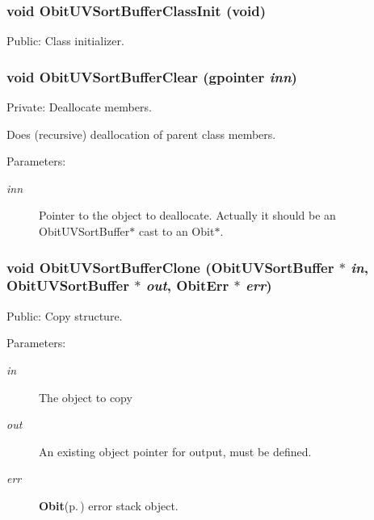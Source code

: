 \subsubsection{\setlength{\rightskip}{0pt plus 5cm}void Obit\-UVSort\-Buffer\-Class\-Init (void)}\label{ObitUVSortBuffer_8c_a15}


Public: Class initializer. 

\subsubsection{\setlength{\rightskip}{0pt plus 5cm}void Obit\-UVSort\-Buffer\-Clear (gpointer {\em inn})}\label{ObitUVSortBuffer_8c_a4}


Private: Deallocate members. 

Does (recursive) deallocation of parent class members. \begin{Desc}
\item[Parameters:]
\begin{description}
\item[{\em inn}]Pointer to the object to deallocate. Actually it should be an Obit\-UVSort\-Buffer$\ast$ cast to an Obit$\ast$. \end{description}
\end{Desc}
\subsubsection{\setlength{\rightskip}{0pt plus 5cm}void Obit\-UVSort\-Buffer\-Clone ({\bf Obit\-UVSort\-Buffer} $\ast$ {\em in}, {\bf Obit\-UVSort\-Buffer} $\ast$ {\em out}, {\bf Obit\-Err} $\ast$ {\em err})}\label{ObitUVSortBuffer_8c_a10}


Public: Copy structure. 

\begin{Desc}
\item[Parameters:]
\begin{description}
\item[{\em in}]The object to copy \item[{\em out}]An existing object pointer for output, must be defined. \item[{\em err}]{\bf Obit}{\rm (p.\,\pageref{structObit})} error stack object. \end{description}
\end{Desc}
